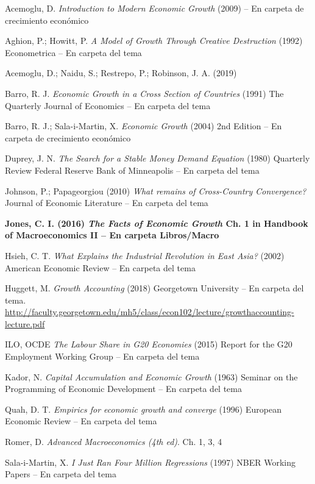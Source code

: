 \documentclass{nuevotema}
\begin{document}
Acemoglu, D. \textit{Introduction to Modern Economic Growth} (2009) -- En carpeta de crecimiento económico

Aghion, P.; Howitt, P. \textit{A Model of Growth Through Creative Destruction} (1992) Econometrica -- En carpeta del tema

Acemoglu, D.; Naidu, S.; Restrepo, P.; Robinson, J. A. (2019)

Barro, R. J. \textit{Economic Growth in a Cross Section of Countries} (1991) The Quarterly Journal of Economics -- En carpeta del tema

Barro, R. J.; Sala-i-Martin, X. \textit{Economic Growth} (2004) 2nd Edition -- En carpeta de crecimiento económico

Duprey, J. N. \textit{The Search for a Stable Money Demand Equation} (1980) Quarterly Review Federal Reserve Bank of Minneapolis -- En carpeta del tema

Johnson, P.; Papageorgiou (2010) \textit{What remains of Cross-Country Convergence?} Journal of Economic Literature -- En carpeta del tema

\textbf{Jones, C. I. (2016) \textit{The Facts of Economic Growth} Ch. 1 in Handbook of Macroeconomics II -- En carpeta Libros/Macro}

Hsieh, C. T. \textit{What Explains the Industrial Revolution in East Asia?} (2002) American Economic Review -- En carpeta del tema

Huggett, M. \textit{Growth Accounting} (2018) Georgetown University -- En carpeta del tema. \url{http://faculty.georgetown.edu/mh5/class/econ102/lecture/growthaccounting-lecture.pdf}

ILO, OCDE \textit{The Labour Share in G20 Economies} (2015) Report for the G20 Employment Working Group -- En carpeta del tema

Kador, N. \textit{Capital Accumulation and Economic Growth} (1963) Seminar on the Programming of Economic Development -- En carpeta del tema

Quah, D. T. \textit{Empirics for economic growth and converge} (1996) European Economic Review -- En carpeta del tema

Romer, D. \textit{Advanced Macroeconomics (4th ed)}. Ch. 1, 3, 4

Sala-i-Martin, X. \textit{I Just Ran Four Million Regressions} (1997) NBER Working Papers -- En carpeta del tema
\end{document}
